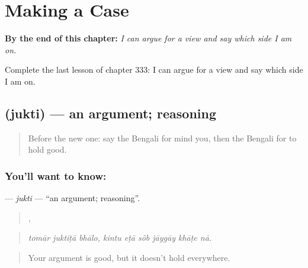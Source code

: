 
\chapter{Making a Case}
\label{ch:bn-making-a-case}

\begin{chapteropening}
\textbf{By the end of this chapter:} \emph{I can argue for a view and say which side I am on.}

Complete the last lesson of chapter 333: I can argue for a view and say which side I am on.
\end{chapteropening}

\section[\texorpdfstring{\bn{যুক্তি} (jukti)}{যুক্তি (jukti)}]{ (jukti) — an argument; reasoning}

\label{lesson:BN-C333-jukti}



\begin{quote}
Before the new one: say the Bengali for mind you, then the Bengali for to hold good.
\end{quote}

\subsection*{You'll want to know: }
\textbf{} — \emph{jukti} — \textquotedblleft{}an argument; reasoning\textquotedblright{}.

\begin{quote}
  ,      
\end{quote}

\begin{quote}
\emph{tomār juktiṭā bhālo, kintu eṭā sôb jāygāy khāṭe nā.}
\end{quote}

\begin{quote}
Your argument is good, but it doesn't hold everywhere.
\end{quote}


